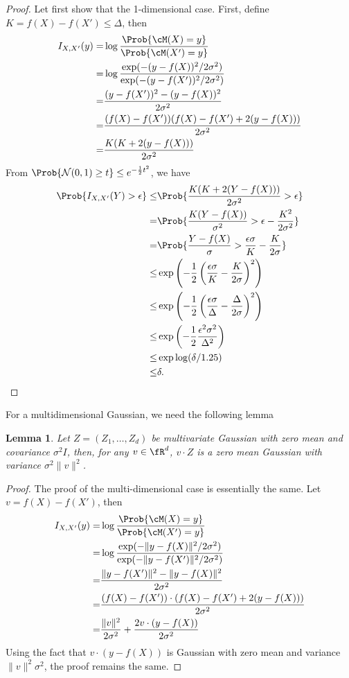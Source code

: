\documentclass[11pt, a4paper]{article}
\newtheorem{lemma}{Lemma}
\begin{document}
\begin{proof}
Let first show that the 1-dimensional case.
First, define $K = f(X) - f(X') \leq \Delta$, then
\begin{align}
    I_{X,X'}(y) =&\log \frac{\Prob{\cM(X)=y}}{\Prob{\cM(X')=y}} \\
    =& \log\frac{\exp(-(y-f(X))^2/2\sigma^2)}{\exp(-(y-f(X'))^2/2\sigma^2)}\\
    =& \frac{(y-f(X'))^2 - (y-f(X))^2}{2\sigma^2}\\
    =& \frac{(f(X) - f(X')) (f(X)-f(X') + 2(y-f(X)))}{2\sigma^2}\\
    =& \frac{K(K + 2(y-f(X)))}{2\sigma^2}
\end{align}
From $\Prob{\mathcal{N}(0, 1) \geq t}\leq e^{-\frac{1}{2}t^2}$, we have
\begin{align}
    \Prob{I_{X,X'}(Y) >\epsilon} 
    \leq &\Prob {\frac{K(K + 2(Y-f(X)))}{2\sigma^2} > \epsilon}\\
    =&\Prob {\frac{K(Y-f(X)) }{\sigma^2} > \epsilon- \frac{K^2}{2\sigma^2}}\\
    =&\Prob {\frac{Y-f(X) }{\sigma} > \frac{\epsilon\sigma}{K}- \frac{K}{2\sigma}}\\
    \leq& \exp\left(-\frac{1}{2}\left(\frac{\epsilon\sigma}{K}- \frac{K}{2\sigma}\right)^2\right)\\
    \leq& \exp\left(-\frac{1}{2}\left(\frac{\epsilon\sigma}{\Delta}- \frac{\Delta}{2\sigma}\right)^2\right)\\
    \leq& \exp\left(-\frac{1}{2}\frac{\epsilon^2\sigma^2}{\Delta^2}\right)\\
    \leq& \exp \log (\delta/1.25)\\
    \leq& \delta.
\end{align}

\end{proof}
For a multidimensional Gaussian, we need the following lemma
\begin{lemma}
    Let $Z = (Z_1, \dots, Z_d)$ be multivariate Gaussian with zero mean and covariance $\sigma^2 I$,
    then, for any $v\in\fR^d$, $v\cdot Z$ is a zero mean Gaussian with variance $\sigma^2 \|v\|^2$.
\end{lemma}
\begin{proof}
    The proof of the multi-dimensional case is essentially the same.
    Let $v = f(X) - f(X')$, then
    \begin{align}
        I_{X,X'}(y) =&\log \frac{\Prob{\cM(X)=y}}{\Prob{\cM(X')=y}} \\
        =& \log\frac{\exp(-\|y-f(X)\|^2/2\sigma^2)}{\exp(-\|y-f(X')\|^2/2\sigma^2)}\\
        =& \frac{\|y-f(X')\|^2 - \|y-f(X)\|^2}{2\sigma^2}\\
        =& \frac{(f(X) - f(X'))\cdot (f(X)-f(X') + 2(y-f(X)))}{2\sigma^2}\\
        =& \frac{\|v\|^2}{2\sigma^2} + \frac{2v\cdot (y-f(X))}{2\sigma^2}
    \end{align}
    Using the fact that $v\cdot (y-f(X))$ is Gaussian with zero mean and variance $\|v\|^2\sigma^2$,
    the proof remains the same.
\end{proof}
\end{document}

